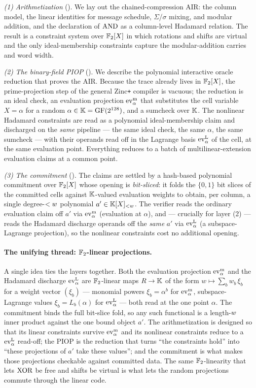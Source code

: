 \emph{(1) Arithmetization} (). We lay out the
chained-compression AIR: the column model, the linear identities for
message schedule, $\Sigma$/$\sigma$ mixing, and modular addition, and the
declaration of $\operatorname{AND}$ as a column-level Hadamard relation. The result is
a constraint system over $\mathbb{F}_2[X]$ in which rotations and shifts are
virtual and the only ideal-membership constraints capture the
modular-addition carries and word width.

\emph{(2) The binary-field PIOP} (). We
describe the polynomial interactive oracle reduction that proves the AIR.
Because the trace already lives in $\mathbb{F}_2[X]$, the prime-projection step
of the general Zinc\texttt{+} compiler is vacuous; the reduction is an
ideal check, an evaluation projection $\operatorname{ev}^{\mathrm{m}}_{\alpha}$ that substitutes the cell
variable $X=\alpha$ for a random $\alpha\in\mathbb{K}=\mathrm{GF}(2^{128})$, and a
sumcheck over $\mathbb{K}$. The nonlinear Hadamard constraints are read as a
polynomial ideal-membership claim and discharged on the \emph{same}
pipeline --- the same ideal check, the same $\alpha$, the same sumcheck ---
with their operands read off in the Lagrange basis $\operatorname{ev}^{\mathrm{L}}_{\alpha}$ of the cell, at
the same evaluation point.
Everything reduces to a batch of multilinear-extension evaluation claims at
a common point.

\emph{(3) The commitment} (). The claims are settled
by a hash-based polynomial commitment over $\mathbb{F}_2[X]$ whose opening is
\emph{bit-sliced}: it folds the $\{0,1\}$ bit slices of the committed
cells against $\mathbb{K}$-valued evaluation weights to obtain, per column, a
single degree-$<w$ polynomial $a'\in\mathbb{K}[X]_{<w}$. The verifier reads the
ordinary evaluation claim off $a'$ via $\operatorname{ev}^{\mathrm{m}}_{\alpha}$ (evaluation at $\alpha$),
and --- crucially for layer (2) --- reads the Hadamard discharge operands
off the \emph{same} $a'$ via $\operatorname{ev}^{\mathrm{L}}_{\alpha}$ (a subspace-Lagrange projection), so
the nonlinear constraints cost no additional opening.

\paragraph{The unifying thread: $\mathbb{F}_2$-linear projections.} A single
idea ties the layers together. Both the evaluation projection $\operatorname{ev}^{\mathrm{m}}_{\alpha}$ and
the Hadamard discharge $\operatorname{ev}^{\mathrm{L}}_{\alpha}$ are $\mathbb{F}_2$-linear maps
$R \to \mathbb{K}$ of the form $w \mapsto \sum_b w_b\,\xi_b$ for a weight
vector $(\xi_b)$ --- monomial powers $\xi_b=\alpha^b$ for $\operatorname{ev}^{\mathrm{m}}_{\alpha}$,
subspace-Lagrange values $\xi_b = L_b(\alpha)$ for $\operatorname{ev}^{\mathrm{L}}_{\alpha}$ --- both read at the one point $\alpha$. The commitment
binds the full bit-slice fold, so any such functional is a length-$w$
inner product against the one bound object $a'$. The arithmetization is
designed so that its linear constraints survive $\operatorname{ev}^{\mathrm{m}}_{\alpha}$ and its nonlinear
constraints reduce to a $\operatorname{ev}^{\mathrm{L}}_{\alpha}$ read-off; the PIOP is the reduction that
turns ``the constraints hold'' into ``these projections of $a'$ take
these values''; and the commitment is what makes those projections
checkable against committed data. The same $\mathbb{F}_2$-linearity that lets
$\operatorname{XOR}$ be free and shifts be virtual is what lets the random projections
commute through the linear code.

